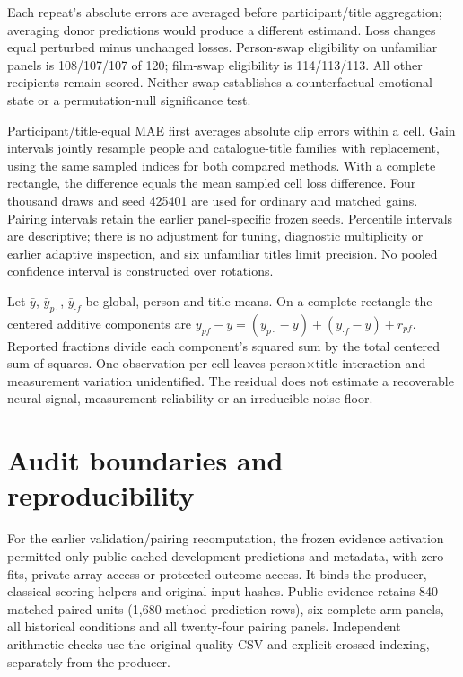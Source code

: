 \documentclass[10pt,a4paper]{article}
\begin{document}
Each repeat's absolute errors are averaged before participant/title aggregation; averaging donor predictions would produce a different estimand. Loss changes equal perturbed minus unchanged losses. Person-swap eligibility on unfamiliar panels is 108/107/107 of 120; film-swap eligibility is 114/113/113. All other recipients remain scored. Neither swap establishes a counterfactual emotional state or a permutation-null significance test.

Participant/title-equal MAE first averages absolute clip errors within a cell. Gain intervals jointly resample people and catalogue-title families with replacement, using the same sampled indices for both compared methods. With a complete rectangle, the difference equals the mean sampled cell loss difference. Four thousand draws and seed 425401 are used for ordinary and matched gains. Pairing intervals retain the earlier panel-specific frozen seeds. Percentile intervals are descriptive; there is no adjustment for tuning, diagnostic multiplicity or earlier adaptive inspection, and six unfamiliar titles limit precision. No pooled confidence interval is constructed over rotations.

Let \(\bar y\), \(\bar y_{p\cdot}\), \(\bar y_{\cdot f}\) be global, person and title means. On a complete rectangle the centered additive components are \(y_{pf}-\bar y=(\bar y_{p\cdot}-\bar y)+(\bar y_{\cdot f}-\bar y)+r_{pf}\). Reported fractions divide each component's squared sum by the total centered sum of squares. One observation per cell leaves person\(\times\)title interaction and measurement variation unidentified. The residual does not estimate a recoverable neural signal, measurement reliability or an irreducible noise floor.

\section{Audit boundaries and reproducibility}
For the earlier validation/pairing recomputation, the frozen evidence activation permitted only public cached development predictions and metadata, with zero fits, private-array access or protected-outcome access. It binds the producer, classical scoring helpers and original input hashes. Public evidence retains 840 matched paired units (1,680 method prediction rows), six complete arm panels, all historical conditions and all twenty-four pairing panels. Independent arithmetic checks use the original quality CSV and explicit crossed indexing, separately from the producer.
\end{document}
